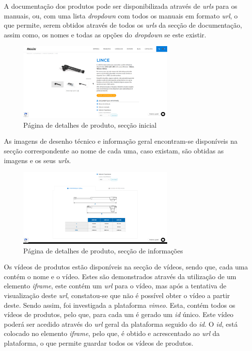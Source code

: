 A documentação dos produtos pode ser disponibilizada através de \textit{urls} para os manuais, ou, com uma lista \textit{dropdown} com todos os manuais em formato \textit{url}, o que permite, serem obtidos através de todos os \textit{urls} da secção de documentação, assim como, os nomes e todas as opções do \textit{dropdown} se este existir.

\begin{figure}[htb]
    \centering
    
    \includegraphics[width=0.7\textwidth]{images/implementacao/scraper/pagina_detalhes_produto.png}
    \caption{Página de detalhes de produto, secção inicial}
    \label{fig:53}
\end{figure}

\newpage

As imagens de desenho técnico e informação geral encontram-se disponíveis na secção correspondente ao nome de cada uma, caso existam, são obtidas as imagens e os seus \textit{urls}.

\begin{figure}[htb]
    \centering
    
    \includegraphics[width=0.7\textwidth]{images/implementacao/scraper/pagina_detalhes_desenhos.png}
    \caption{Página de detalhes de produto, secção de informações}
    \label{fig:54}
\end{figure}

Os vídeos de produtos estão disponíveis na secção de vídeos, sendo que, cada uma contém o nome e o vídeo. Estes são demonstrados através da utilização de um elemento \textit{iframe}, este contém um \textit{url} para o vídeo, mas após a tentativa de visualização deste \textit{url}, constatou-se que não é possível obter o vídeo a partir deste. Sendo assim, foi investigada a plataforma \textit{vimeo}. Esta, contém todos os vídeos de produtos, pelo que, para cada um é gerado um \textit{id} único. Este vídeo poderá ser acedido através do \textit{url} geral da plataforma seguido do \textit{id}. O \textit{id}, está colocado no elemento \textit{iframe}, pelo que, é obtido e acrescentado ao \textit{url} da plataforma, o que permite guardar todos os vídeos de produtos.

